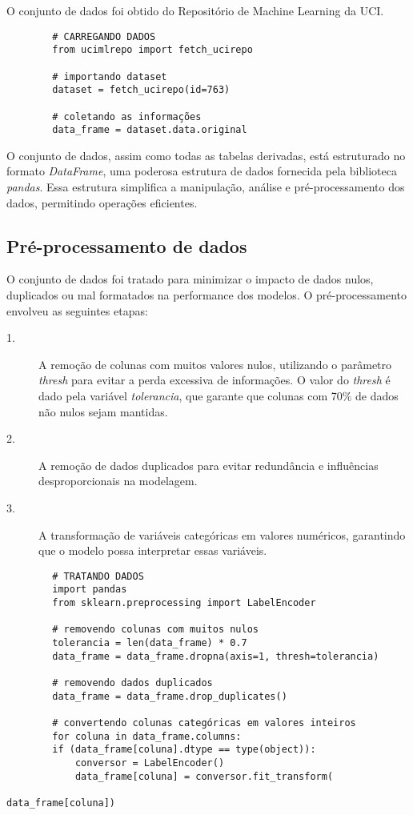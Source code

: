 \documentclass[12pt,a4paper]{article}
\begin{document}
\quad\space O conjunto de dados foi obtido do Repositório de Machine Learning da UCI.

\begin{mdframed}
	\begin{verbatim}
		# CARREGANDO DADOS
		from ucimlrepo import fetch_ucirepo 
		
		# importando dataset
		dataset = fetch_ucirepo(id=763)
		
		# coletando as informações
		data_frame = dataset.data.original
	\end{verbatim}
\end{mdframed}
\vspace{0.15cm}
\quad\space O conjunto de dados, assim como todas as tabelas derivadas, está estruturado no formato \textit{DataFrame}, uma poderosa estrutura de dados fornecida pela biblioteca \textit{pandas}. Essa estrutura simplifica a manipulação, análise e pré-processamento dos dados, permitindo operações eficientes.

\subsection{Pré-processamento de dados}

\quad\space O conjunto de dados foi tratado para minimizar o impacto de dados nulos, duplicados ou mal formatados na performance dos modelos. O pré-processamento envolveu as seguintes etapas:

\begin{description}
	\item[1.] A remoção de colunas com muitos valores nulos, utilizando o parâmetro \textit{thresh} para evitar a perda excessiva de informações. O valor do \textit{thresh} é dado pela variável \textit{tolerancia}, que garante que colunas com 70$\%$ de dados não nulos sejam mantidas.
	\item[2.] A remoção de dados duplicados para evitar redundância e influências desproporcionais na modelagem.
	\item[3.] A transformação de variáveis categóricas em valores numéricos, garantindo que o modelo possa interpretar essas variáveis.
\end{description}

\begin{mdframed}
	\begin{verbatim}
		# TRATANDO DADOS
		import pandas
		from sklearn.preprocessing import LabelEncoder
		
		# removendo colunas com muitos nulos
		tolerancia = len(data_frame) * 0.7
		data_frame = data_frame.dropna(axis=1, thresh=tolerancia)
		
		# removendo dados duplicados
		data_frame = data_frame.drop_duplicates()
		
		# convertendo colunas categóricas em valores inteiros
		for coluna in data_frame.columns:
		if (data_frame[coluna].dtype == type(object)):
			conversor = LabelEncoder()
			data_frame[coluna] = conversor.fit_transform(
			     																															data_frame[coluna])
	\end{verbatim}
\end{mdframed}
\end{document}
